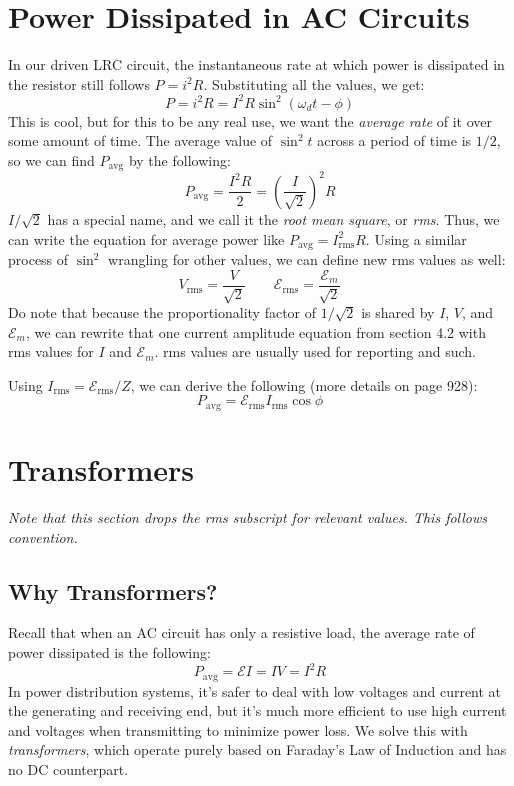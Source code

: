 \documentclass[]{article}
\begin{document}
\section{Power Dissipated in AC Circuits}
In our driven LRC circuit, the instantaneous rate at which power is dissipated in the resistor still follows $ P = i^2 R $. Substituting all the values, we get:
\[ P = i^2 R = I^2 R \sin^2 \! \left(\omega_d t - \phi\right) \]
This is cool, but for this to be any real use, we want the \emph{average rate} of it over some amount of time. The average value of $ \sin^2 t $ across a period of time is $ 1/2 $, so we can find $ P_{\mathrm{avg}} $ by the following:
\[ P_{\mathrm{avg}} = \frac{I^2 R}{2} = \left(\frac{I}{\sqrt{2}}\right)^2 \! R \]
$ I / \sqrt{2} $ has a special name, and we call it the \emph{root mean square}, or \emph{rms}. Thus, we can write the equation for average power like $ P_{\mathrm{avg}} = I_{\mathrm{rms}}^2 R $.
Using a similar process of $ \sin^2 $ wrangling for other values, we can define new rms values as well:
\[ V_{\mathrm{rms}} = \frac{V}{\sqrt{2}} \qquad \mathcal{E}_{\mathrm{rms}} = \frac{\mathcal{E}_m}{\sqrt{2}} \]
Do note that because the proportionality factor of $ 1/\sqrt{2} $ is shared by $ I $, $ V $, and $ \mathcal{E}_m $, we can rewrite that one current amplitude equation from section 4.2 with rms values for $ I $ and $ \mathcal{E}_m $. rms values are usually used for reporting and such.

Using $ I_{\mathrm{rms}} = \mathcal{E}_{\mathrm{rms}} / Z $, we can derive the following (more details on page 928):
\[ P_{\mathrm{avg}} = \mathcal{E}_{\mathrm{rms}} I_{\mathrm{rms}} \cos \phi \]

\section{Transformers}
\emph{Note that this section drops the rms subscript for relevant values. This follows convention.}
\subsection{Why Transformers?}
Recall that when an AC circuit has only a resistive load, the average rate of power dissipated is the following:
\[ P_{\mathrm{avg}} = \mathcal{E} I = I V = I^2 R \]
In power distribution systems, it's safer to deal with low voltages and current at the generating and receiving end, but it's much more efficient to use high current and voltages when transmitting to minimize power loss. We solve this with \emph{transformers}, which operate purely based on Faraday's Law of Induction and has no DC counterpart.
\end{document}

